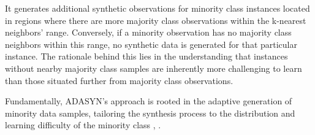 It generates additional synthetic observations for minority class instances located in regions where there are more majority class observations within the k-nearest neighbors' range. Conversely, if a minority observation has no majority class neighbors within this range, no synthetic data is generated for that particular instance. The rationale behind this lies in the understanding that instances without nearby majority class samples are inherently more challenging to learn than those situated further from majority class observations.

Fundamentally, ADASYN's approach is rooted in the adaptive generation of minority data samples, tailoring the synthesis process to the distribution and learning difficulty of the minority class \cite{Brandt2020}, \cite{He2008}.









\begin{comment}
\NoCaptionOfAlgo
\begin{algorithm}[H]
\SetAlgoLined
\DontPrintSemicolon
\SetKwComment{Comment}{$\triangleright$\ }{}
\SetAlCapSkip{1em}
\SetAlCapNameFnt{\normalfont\normalsize}
\caption{Timestep $\textcolor{darkgray}{t \to t + \delta t}$}

Select a random sample of the minority class\;

\For{c in \texttt{cells}}{
    $
    \textcolor{darkgray}{r_c} :=
    \begin{cases*}
        \color{teal}{r_S} &\text{if c is sensitive} \\
        \color{purple}{r_R} &\text{if c is resistent}\\
    \end{cases*}$\;
    Total propensity $\textcolor{darkgray}{p := (r_c + d_T) \delta t}$\;
    \uIf{$\textcolor{Purple}{u < p}$}{ \tcp{cell active}
        \uIf{$\textcolor{Purple}{u < \frac{r_c \delta t}{p}}$}{
            \texttt{AttemptProliferation}\;
        }
        \Else{
            \texttt{Death}\;
        }
    } 
    \Else{  \tcp{cell inactive}
        \texttt{continue}\;
    }
}
\end{algorithm}
\end{comment}
